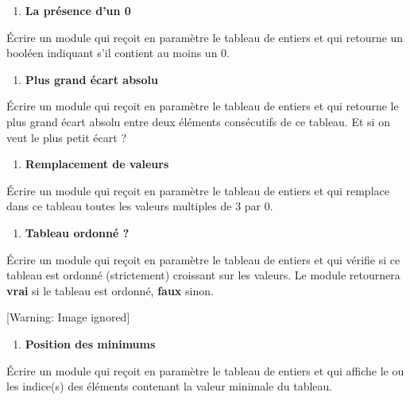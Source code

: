 \liststyleExercice
\setcounter{saveenum}{\value{enumi}}
\begin{enumerate}
\setcounter{enumi}{\value{saveenum}}
\item {\sffamily\bfseries
La présence d'un 0}
\end{enumerate}
{
Écrire un module qui reçoit en paramètre le tableau
 de  entiers et qui
retourne un booléen indiquant s'il contient au moins
un 0. }

\liststyleExercice
\setcounter{saveenum}{\value{enumi}}
\begin{enumerate}
\setcounter{enumi}{\value{saveenum}}
\item {\sffamily\bfseries
Plus grand écart absolu}
\end{enumerate}
{
Écrire un module qui reçoit en paramètre le tableau
 de  entiers et qui
retourne le plus grand écart absolu entre deux éléments consécutifs de
ce tableau.
Et si on veut le plus petit écart ?}

\liststyleExercice
\setcounter{saveenum}{\value{enumi}}
\begin{enumerate}
\setcounter{enumi}{\value{saveenum}}
\item {\sffamily\bfseries
Remplacement de valeurs}
\end{enumerate}
{
Écrire un module qui reçoit en paramètre le tableau
 de  entiers et qui
remplace dans ce tableau toutes les valeurs multiples de 3 par 0.}

\liststyleExercice
\setcounter{saveenum}{\value{enumi}}
\begin{enumerate}
\setcounter{enumi}{\value{saveenum}}
\item {\sffamily\bfseries
Tableau ordonné ?}
\end{enumerate}
{
Écrire un module qui reçoit en paramètre le tableau
 de  entiers et qui
vérifie si ce tableau est ordonné (strictement) croissant sur les
valeurs. Le module retournera \textbf{vrai} si le tableau est ordonné,
\textbf{faux} sinon. }

\begin{center}
 [Warning: Image ignored] %

\end{center}
\liststyleExercice
\setcounter{saveenum}{\value{enumi}}
\begin{enumerate}
\setcounter{enumi}{\value{saveenum}}
\item {\sffamily\bfseries
Position des minimums}
\end{enumerate}
{
Écrire un module qui reçoit en paramètre le tableau
 de  entiers et qui
affiche le ou les indice(s) des éléments contenant la valeur minimale
du tableau.}

